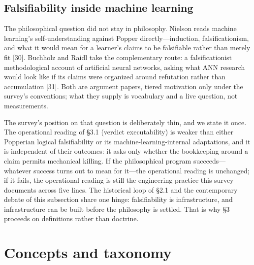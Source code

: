 \documentclass[11pt]{article}
\begin{document}
\subsection{Falsifiability inside machine learning}
\noindent The philosophical question did not stay in philosophy. Nielson reads machine learning's self-understanding against Popper directly—induction, falsificationism, and what it would mean for a learner's claims to be falsifiable rather than merely fit [30]. Buchholz and Raidl take the complementary route: a falsificationist methodological account of artificial neural networks, asking what ANN research would look like if its claims were organized around refutation rather than accumulation [31]. Both are argument papers, tiered motivation only under the survey's conventions; what they supply is vocabulary and a live question, not measurements.\par
\noindent The survey's position on that question is deliberately thin, and we state it once. The operational reading of §3.1 (verdict executability) is weaker than either Popperian logical falsifiability or its machine-learning-internal adaptations, and it is independent of their outcomes: it asks only whether the bookkeeping around a claim permits mechanical killing. If the philosophical program succeeds—whatever success turns out to mean for it—the operational reading is unchanged; if it fails, the operational reading is still the engineering practice this survey documents across five lines. The historical loop of §2.1 and the contemporary debate of this subsection share one hinge: falsifiability is infrastructure, and infrastructure can be built before the philosophy is settled. That is why §3 proceeds on definitions rather than doctrine.\par
\section{Concepts and taxonomy}
\label{sec:3}
\end{document}
